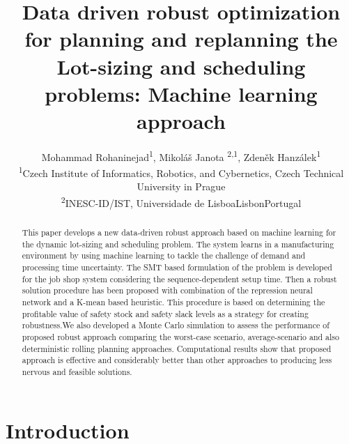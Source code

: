 \documentclass[letterpaper]{article} %
\title{Data driven robust optimization for planning and replanning the Lot-sizing and scheduling problems: Machine learning approach}
\author{Mohammad Rohaninejad\textsuperscript{\rm 1}, Mikoláš Janota \textsuperscript{\rm 2}\textsuperscript{\rm ,1}, Zdeněk Hanzálek\textsuperscript{\rm 1}
\\
\textsuperscript{\rm 1}Czech Institute of Informatics, Robotics, and Cybernetics, Czech Technical University in Prague\\
\textsuperscript{\rm 2}INESC-ID/IST, Universidade de LisboaLisbonPortugal\\
}
\begin{document}
\maketitle

\begin{abstract}
This paper develops a new data-driven robust approach based on machine learning for the dynamic lot-sizing and scheduling problem. The system learns in a manufacturing environment by using machine learning to tackle the challenge of demand and processing time uncertainty. The SMT based formulation of the problem is developed for the job shop system considering the sequence-dependent setup time. Then a robust solution procedure has been proposed with combination of the repression neural network and a K-mean based heuristic. This procedure is based on determining the profitable value of safety stock and safety slack levels as a strategy for creating robustness.We also developed a Monte Carlo simulation to assess the performance of proposed robust approach comparing the worst-case scenario, average-scenario and also deterministic rolling planning approaches. Computational results show that proposed approach is effective and considerably better than other approaches to producing less nervous and feasible solutions. 
\end{abstract}



\section{Introduction}
\end{document}
